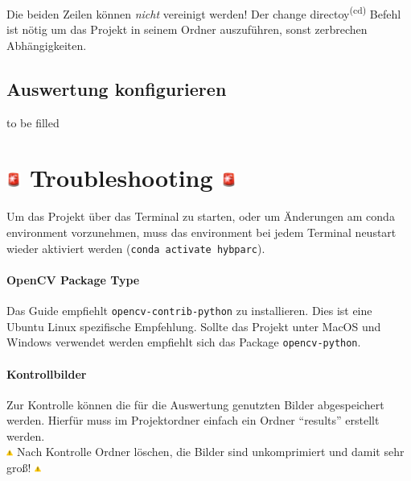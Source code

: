 \documentclass[a4paper, 10pt]{article}
\newcommand{\code}[1]{\texttt{#1}}
\begin{document}
Die beiden Zeilen können \emph{nicht} vereinigt werden! Der change directoy\textsuperscript{(cd)} Befehl ist nötig um das Projekt in seinem Ordner auszuführen, sonst zerbrechen Abhängigkeiten.

\subsection{Auswertung konfigurieren}
\label{ssec:configure-configuration}
to be filled

\section{\includegraphics[height=0.65em]{emojis/police-light.png} Troubleshooting \includegraphics[height=0.65em]{emojis/police-light.png}}
\label{sec:troubleshooting}

Um das Projekt über das Terminal zu starten, oder um Änderungen am conda environment vorzunehmen, muss das environment bei jedem Terminal neustart wieder aktiviert werden (\code{conda activate hybparc}).

\paragraph{OpenCV Package Type}
Das Guide empfiehlt \code{opencv-contrib-python} zu installieren. Dies ist eine Ubuntu Linux spezifische Empfehlung. Sollte das Projekt unter MacOS und Windows verwendet werden empfiehlt sich das Package \code{opencv-python}.

\paragraph{Kontrollbilder}
Zur Kontrolle können die für die Auswertung genutzten Bilder abgespeichert werden. Hierfür muss im Projektordner einfach ein Ordner \enquote{results} erstellt werden.
\\
{\footnotesize \includegraphics[height=0.6em]{emojis/warning.png} Nach Kontrolle Ordner löschen, die Bilder sind unkomprimiert und damit sehr groß! \includegraphics[height=0.6em]{emojis/warning.png}}
\end{document}
